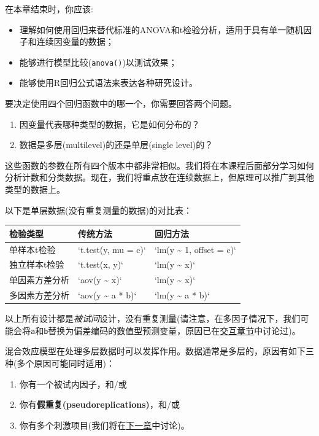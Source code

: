 \documentclass[
]{book}
\providecommand{\tightlist}{%
  \setlength{\itemsep}{0pt}\setlength{\parskip}{0pt}}
\begin{document}
在本章结束时，你应该:

\begin{itemize}
\tightlist
\item
  理解如何使用回归来替代标准的ANOVA和t检验分析，适用于具有单一随机因子和连续因变量的数据；
\item
  能够进行模型比较(\texttt{anova()})以测试效果；
\item
  能够使用R回归公式语法来表达各种研究设计。
\end{itemize}

要决定使用四个回归函数中的哪一个，你需要回答两个问题。

\begin{enumerate}
\def\labelenumi{\arabic{enumi}.}
\tightlist
\item
  因变量代表哪种类型的数据，它是如何分布的？
\item
  数据是多层(multilevel)的还是单层(single level)的？
\end{enumerate}

这些函数的参数在所有四个版本中都非常相似。我们将在本课程后面部分学习如何分析计数和分类数据。现在，我们将重点放在连续数据上，但原理可以推广到其他类型的数据上。

以下是单层数据(没有重复测量的数据)的对比表：

\begin{tabular}{l|l|l}
\hline
检验类型 & 传统方法 & 回归方法\\
\hline
单样本t检验 & `t.test(y, mu = c)` & `lm(y \textasciitilde{} 1, offset = c)`\\
\hline
独立样本t检验 & `t.test(x, y)` & `lm(y \textasciitilde{} x)`\\
\hline
单因素方差分析 & `aov(y \textasciitilde{} x)` & `lm(y \textasciitilde{} x)`\\
\hline
多因素方差分析 & `aov(y \textasciitilde{} a * b)` & `lm(y \textasciitilde{} a * b)`\\
\hline
\end{tabular}

以上所有设计都是\emph{被试间}设计，没有重复测量(请注意，在多因子情况下，我们可能会将\texttt{a}和\texttt{b}替换为偏差编码的数值型预测变量，原因已在\href{交互效应.html}{交互章节}中讨论过)。

混合效应模型在处理多层数据时可以发挥作用。数据通常是多层的，原因有如下三种(多个原因可能同时适用)：

\begin{enumerate}
\def\labelenumi{\arabic{enumi}.}
\tightlist
\item
  你有一个被试内因子，和/或
\item
  你有\textbf{假重复(pseudoreplications)}，和/或
\item
  你有多个刺激项目(我们将在\href{交叉随机因子线性混合效应模型.html}{下一章}中讨论)。
\end{enumerate}
\end{document}
